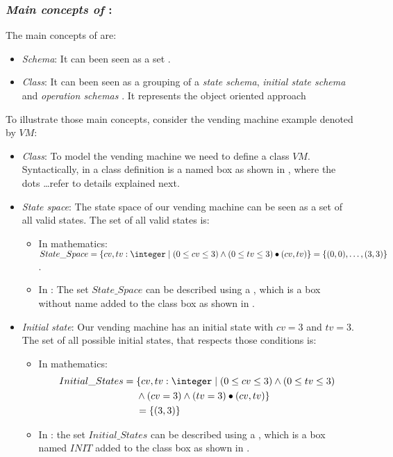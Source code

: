 \subsubsection{\textit{Main concepts of \oz{}}:} 
\label{main_concepts_oz} 
The main concepts of \oz{} are:
\begin{itemize}
\item \textit{Schema}: It can been seen as a set \cite{woodcock}.
\item \textit{Class}: It can been seen as a grouping of a \textit{state schema}, \textit{initial state schema} and \textit{operation schemas} \cite{kenji}. It represents the object oriented approach 
\end{itemize}
To illustrate those main concepts, consider the vending machine example denoted by $VM$:
\begin{itemize}
\item \textit{Class}: To model the vending machine we need to define a class $VM$. Syntactically, in \oz{}
a class definition is a named box as shown in , where the dots \dots refer to details explained next.


\item \textit{State space}: The state space of our vending machine can be seen as a set of all valid states. The set of all valid states is:
\begin{itemize}
\item In mathematics: $State\_Space=\{cv,tv: \integer\mid (0 \leq  cv \leq 3) \wedge
(0 \leq  tv \leq 3)\bullet(cv,tv)\}  =\{\pair{0}{0},\dots,\pair{3}{3}\}$.
\item In \oz{}: The set $State\_Space$ can be described using a , which is a box without name added to the class box as shown in .
\end{itemize}


\item \textit{Initial state}: Our vending machine has an initial state with $cv = 3$ and $tv = 3$. The set of all possible initial states, that respects those conditions is:  
\begin{itemize}
\item In mathematics:
\begin{equation*}
\begin{aligned}
Initial\_States ={} & \{cv,tv: \integer\mid (0 \leq  cv \leq 3) \wedge (0 \leq  tv \leq 3)\\
      & \wedge (cv = 3) \wedge (tv = 3)\bullet(cv,tv)\} \\
      &  =\{\pair{3}{3}\}
\end{aligned}
\end{equation*}
\item In \oz{}: the set $Initial\_States$ can be described using a , which is a box named $INIT$ added to the class box  as shown in .
\end{itemize}



\end{itemize}
